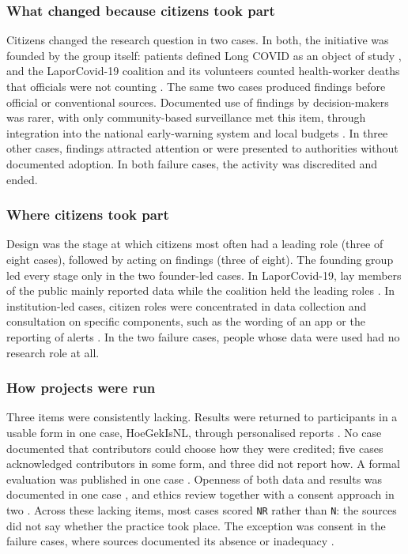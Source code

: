 \documentclass[
  number,
  preprint]{elsarticle}
\begin{document}
\subsubsection{What changed because citizens took
part}\label{what-changed-because-citizens-took-part}

Citizens changed the research question in two cases. In both, the
initiative was founded by the group itself: patients defined Long COVID
as an object of study \citep{mccorkell2021, fitzgerald2024}, and the
LaporCovid-19 coalition and its volunteers counted health-worker deaths
that officials were not counting \citep{ekawati2022}. The same two cases
produced findings before official or conventional sources. Documented
use of findings by decision-makers was rarer, with only community-based
surveillance met this item, through integration into the national
early-warning system and local budgets \citep{ifrc2021}. In three other
cases, findings attracted attention or were presented to authorities
without documented adoption. In both failure cases, the activity was
discredited and ended.

\subsubsection{Where citizens took part}\label{where-citizens-took-part}

Design was the stage at which citizens most often had a leading role
(three of eight cases), followed by acting on findings (three of eight).
The founding group led every stage only in the two founder-led cases. In
LaporCovid-19, lay members of the public mainly reported data while the
coalition held the leading roles \citep{rinaldi2024, ekawati2022}. In
institution-led cases, citizen roles were concentrated in data
collection and consultation on specific components, such as the wording
of an app \citep{youthgems_decisions2025} or the reporting of alerts
\citep{ifrc2021}. In the two failure cases, people whose data were used
had no research role at all.

\subsubsection{How projects were run}\label{how-projects-were-run}

Three items were consistently lacking. Results were returned to
participants in a usable form in one case, HoeGekIsNL, through
personalised reports \citep{vanderkrieke2016, mindwise2016}. No case
documented that contributors could choose how they were credited; five
cases acknowledged contributors in some form, and three did not report
how. A formal evaluation was published in one case \citep{ifrc2021}.
Openness of both data and results was documented in one case
\citep{ekawati2022}, and ethics review together with a consent approach
in two \citep{ekawati2022, davis2020preprint}. Across these lacking
items, most cases scored \texttt{NR} rather than \texttt{N}: the sources
did not say whether the practice took place. The exception was consent
in the failure cases, where sources documented its absence or inadequacy
\citep{eysenbach2025, responsibledata_radar}.
\end{document}
